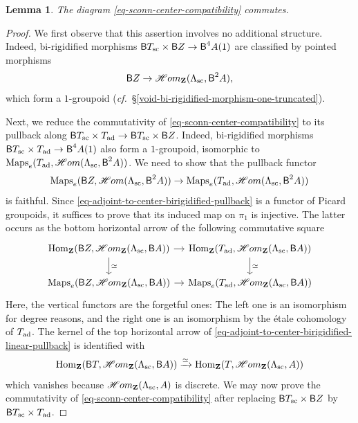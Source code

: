 \documentclass[10pt,english,reqno]{amsart}
\newcommand{\integers}{\mathbf Z}
\newcommand{\Maps}{\operatorname{Maps}}
\newcommand{\Hom}{\operatorname{Hom}}
\newcommand{\SHom}{\mathscr{H}om}
\newcommand{\deloop}{\textnormal{\textsf{B}}}
\newcommand{\sconn}{\textnormal{sc}}
\newcommand{\adjoint}{\textnormal{ad}}
\newtheorem{lem}[subsubsection]{Lemma}
\theoremstyle{definition}
\numberwithin{equation}{section}
\begin{document}
\begin{lem}
\label{lem-sconn-center-compatibility}
The diagram \eqref{eq-sconn-center-compatibility} commutes.
\end{lem}
\begin{proof}
We first observe that this assertion involves no additional structure. Indeed, bi-rigidified morphisms $\deloop T_{\sconn} \times \deloop Z \rightarrow \deloop^4A(1)$ are classified by pointed morphisms
\begin{equation}
\label{eq-sconn-center-compatibility-space}
\deloop Z \rightarrow \SHom_{\integers}(\Lambda_{\sconn}, \deloop^2A),
\end{equation}
which form a $1$-groupoid (\emph{cf.}~\S\ref{void-bi-rigidified-morphism-one-truncated}).

Next, we reduce the commutativity of \eqref{eq-sconn-center-compatibility} to its pullback along $\deloop T_{\sconn} \times T_{\adjoint} \rightarrow \deloop T_{\sconn} \times \deloop Z$. Indeed, bi-rigidified morphisms $\deloop T_{\sconn} \times T_{\adjoint} \rightarrow \deloop^4A(1)$ also form a $1$-groupoid, isomorphic to $\Maps_e(T_{\adjoint}, \SHom(\Lambda_{\sconn}, \deloop^2A))$. We need to show that the pullback functor
\begin{equation}
\label{eq-adjoint-to-center-birigidified-pullback}
\Maps_e(\deloop Z, \SHom(\Lambda_{\sconn}, \deloop^2A)) \rightarrow \Maps_e(T_{\adjoint}, \SHom(\Lambda_{\sconn}, \deloop^2A))
\end{equation}
is faithful. Since \eqref{eq-adjoint-to-center-birigidified-pullback} is a functor of Picard groupoids, it suffices to prove that its induced map on $\pi_1$ is injective. The latter occurs as the bottom horizontal arrow of the following commutative square
\begin{equation}
\label{eq-adjoint-to-center-birigidified-linear-pullback}
\begin{tikzcd}[column sep = 1em]
\Hom_{\integers}(\deloop Z, \SHom_{\integers}(\Lambda_{\sconn}, \deloop A)) \ar[r]\ar[d, "\simeq"] & \Hom_{\integers}(T_{\adjoint}, \SHom_{\integers}(\Lambda_{\sconn}, \deloop A)) \ar[d, "\simeq"] \\
\Maps_e(\deloop Z, \SHom_{\integers}(\Lambda_{\sconn}, \deloop A)) \ar[r] & \Maps_e(T_{\adjoint}, \SHom_{\integers}(\Lambda_{\sconn}, \deloop A))
\end{tikzcd}
\end{equation}
Here, the vertical functors are the forgetful ones: The left one is an isomorphism for degree reasons, and the right one is an isomorphism by the \'etale cohomology of $T_{\adjoint}$. The kernel of the top horizontal arrow of \eqref{eq-adjoint-to-center-birigidified-linear-pullback} is identified with
$$
\Hom_{\integers}(\deloop T, \SHom_{\integers}(\Lambda_{\sconn}, \deloop A)) \xrightarrow{\simeq} \Hom_{\integers}(T, \SHom_{\integers}(\Lambda_{\sconn}, A))
$$
which vanishes because $\SHom_{\integers}(\Lambda_{\sconn}, A)$ is discrete. We may now prove the commutativity of \eqref{eq-sconn-center-compatibility} after replacing $\deloop T_{\sconn} \times \deloop Z$ by $\deloop T_{\sconn} \times T_{\adjoint}$.


\end{proof}
\end{document}
